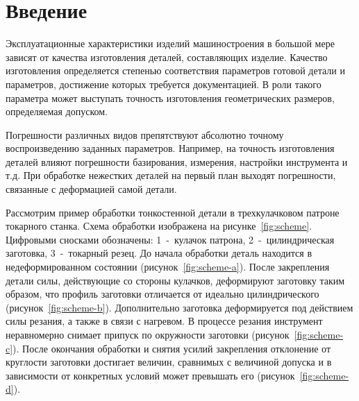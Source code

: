 \documentclass[14pt,oneside,final]{extreport}
\begin{document}
	\renewcommand*\contentsname{\hfill Содержание \hfill}
	\clearpage
	\setcounter{page}{2}
	\tableofcontents
	
	
	\chapter{Введение}
	Эксплуатационные характеристики изделий машиностроения в большой мере зависят от качества изготовления деталей, составляющих изделие. Качество изготовления определяется степенью соответствия параметров готовой детали и параметров, достижение которых требуется документацией. В роли такого параметра может выступать точность изготовления геометрических размеров, определяемая допуском. 
	
	Погрешности различных видов препятствуют абсолютно точному воспроизведению заданных параметров. Например, на точность изготовления деталей влияют погрешности базирования, измерения, настройки инструмента и т.д. При обработке нежестких деталей на первый план выходят погрешности, связанные с деформацией самой детали.
	
	Рассмотрим пример обработки тонкостенной детали в трехкулачковом патроне токарного станка. Схема обработки изображена на рисунке~\ref{fig:scheme}. Цифровыми сносками обозначены: 1~-~кулачок патрона, 2~-~цилиндрическая заготовка, 3~-~токарный резец. До начала обработки деталь находится в недеформированном состоянии (рисунок~\ref{fig:scheme-a}). После закрепления детали силы, действующие со стороны кулачков, деформируют заготовку таким образом, что профиль заготовки отличается от идеально цилиндрического (рисунок~\ref{fig:scheme-b}). Дополнительно заготовка деформируется под действием силы резания, а также в связи с нагревом. В процессе резания инструмент неравномерно снимает припуск по окружности заготовки (рисунок~\ref{fig:scheme-c}). После окончания обработки и снятия усилий закрепления отклонение от круглости заготовки достигает величин, сравнимых с величиной допуска и в зависимости от конкретных условий может превышать его (рисунок~\ref{fig:scheme-d}).
	
\end{document}
